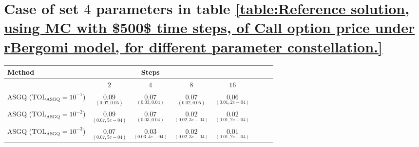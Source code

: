 \section{Case of set $4$ parameters in table \ref{table:Reference solution, using MC with $500$ time steps, of Call option price under rBergomi model, for different parameter constellation.}}\label{appendix:Case of set 4 parameters}
\FloatBarrier
\begin{table}[h!]
	\begin{small}
		\centering
		\begin{tabular}{l*{6}{c}r}
			\toprule[1.5pt]
			Method & & Steps  & &     \\
			\hline	
			& $2$ & $4$ & $8$ & $16$  \\
			\hline
			
			ASGQ ($\text{TOL}_{\text{ASGQ}}=10^{-1}$)  & $\underset{(0.07,0.05)}{\mathbf{0.09}}$ & $\underset{(0.03,0.04)}{\mathbf{0.07}}$& $\underset{(0.02,0.05)}{\mathbf{ 0.07}}$ & $\underset{(0.01,2e-04)}{\mathbf{ 0.06}}$   \\
			
			ASGQ ($\text{TOL}_{\text{ASGQ}}=10^{-2}$)  &  $\underset{(0.07,5e-04)}{\mathbf{0.09}}$& $\underset{(0.03,0.04)}{\mathbf{0.07}}$& $\underset{(0.02,3e-04)}{\mathbf{ 0.02}}$ & $\underset{(0.01,2e-04)}{\mathbf{ 0.02}}$  \\
			ASGQ ($\text{TOL}_{\text{ASGQ}}=10^{-3}$)  &  $\underset{(0.07,5e-04)}{\mathbf{0.07}}$& $\underset{(0.03,4e-04)}{\mathbf{0.03}}$& $\underset{(0.02,3e-04)}{\mathbf{0.02}}$  & $\underset{(0.01,2e-04)}{\mathbf{ 0.01}}$  \\
			

\end{tabular}
\end{small}
\end{table}
